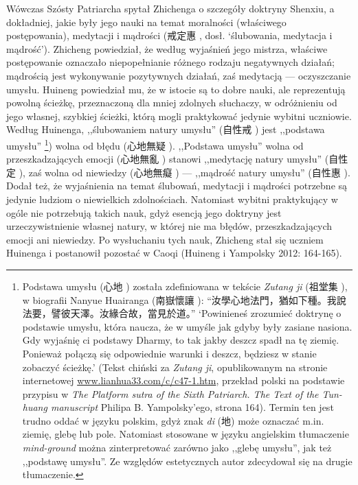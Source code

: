 Wówczas Szósty Patriarcha spytał Zhichenga o szczegóły doktryny Shenxiu, a dokładniej, jakie były jego nauki na temat moralności (właściwego postępowania), medytacji i mądrości (戒定惠 , dosł. `ślubowania, medytacja i mądrość').
Zhicheng powiedział, że według wyjaśnień jego mistrza, właściwe postępowanie oznaczało niepopełnianie różnego rodzaju negatywnych działań; mądrością jest wykonywanie pozytywnych działań, zaś medytacją --- oczyszczanie umysłu.
Huineng powiedział mu, że w istocie są to dobre nauki, ale reprezentują powolną ścieżkę, przeznaczoną dla mniej zdolnych słuchaczy, w odróżnieniu od jego własnej, szybkiej ścieżki, którą mogli praktykować jedynie wybitni uczniowie.
Według Huinenga, ,,ślubowaniem natury umysłu'' (自性戒 ) jest ,,podstawa umysłu''%
\footnote{Podstawa umysłu (心地 ) została zdefiniowana w tekście \textit{Zutang ji} (祖堂集 ), w biografii Nanyue Huairanga (南嶽懷讓 ): “汝學心地法門，猶如下種。我說法要，譬彼天澤。汝緣合故，當見於道。”
`Powinieneś zrozumieć doktrynę o podstawie umysłu, która naucza, że w umyśle jak gdyby były zasiane nasiona. Gdy wyjaśnię ci podstawy Dharmy, to tak jakby deszcz spadł na tę ziemię. Ponieważ połączą się odpowiednie warunki i deszcz, będziesz w stanie zobaczyć ścieżkę.' (Tekst chiński za \textit{Zutang ji}, opublikowanym na stronie internetowej \url{www.lianhua33.com/c/c47-1.htm}, przekład polski na podstawie przypisu w \textit{The Platform sutra of the Sixth Patriarch. The Text of the Tun-huang manuscript} Philipa B. Yampolsky'ego, strona 164). Termin ten jest trudno oddać w języku polskim, gdyż znak \textit{di} (地) może oznaczać m.in. ziemię, glebę lub pole. Natomiast stosowane w języku angielskim tłumaczenie \textit{mind-ground} można zinterpretować zarówno jako ,,glebę umysłu'', jak też ,,podstawę umysłu''. Ze względów estetycznych autor zdecydował się na drugie tłumaczenie.})
wolna od błędu (心地無疑 ).
,,Podstawa umysłu'' wolna od przeszkadzających emocji (心地無亂 ) stanowi ,,medytację natury umysłu'' (自性定 ), zaś wolna od niewiedzy (心地無癡 ) --- ,,mądrość natury umysłu'' (自性惠 ).
Dodał też, że wyjaśnienia na temat ślubowań, medytacji i mądrości potrzebne są jedynie ludziom o niewielkich zdolnościach.
Natomiast wybitni praktykujący w ogóle nie potrzebują takich nauk, gdyż esencją jego doktryny jest urzeczywistnienie własnej natury, w której nie ma błędów, przeszkadzających emocji ani niewiedzy.
Po wysłuchaniu tych nauk, Zhicheng stał się uczniem Huinenga i postanowił pozostać w Caoqi
(Huineng i Yampolsky 2012: 164-165).

